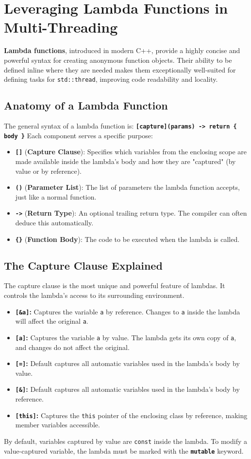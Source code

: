 \documentclass{article} %
\begin{document}
\section{Leveraging Lambda Functions in Multi-Threading}
\textbf{Lambda functions}, introduced in modern C++, provide a highly concise and powerful syntax for creating anonymous function objects. Their ability to be defined inline where they are needed makes them exceptionally well-suited for defining tasks for \texttt{std::thread}, improving code readability and locality.

\subsection{Anatomy of a Lambda Function}
The general syntax of a lambda function is:
\texttt{\textbf{[capture](params) -> return \{ body \}}}
Each component serves a specific purpose:
\begin{itemize}
    \item \textbf{\texttt{[]}} (\textbf{Capture Clause}): Specifies which variables from the enclosing scope are made available inside the lambda's body and how they are "captured" (by value or by reference).
    \item \textbf{\texttt{()}} (\textbf{Parameter List}): The list of parameters the lambda function accepts, just like a normal function.
    \item \textbf{\texttt{->}} (\textbf{Return Type}): An optional trailing return type. The compiler can often deduce this automatically.
    \item \textbf{\texttt{\{\}}} (\textbf{Function Body}): The code to be executed when the lambda is called.
\end{itemize}

\subsection{The Capture Clause Explained}
The capture clause is the most unique and powerful feature of lambdas. It controls the lambda's access to its surrounding environment.
\begin{itemize}
    \item \textbf{\texttt{[\&a]}:} Captures the variable \texttt{a} by reference. Changes to \texttt{a} inside the lambda will affect the original \texttt{a}.
    \item \textbf{\texttt{[a]}:} Captures the variable \texttt{a} by value. The lambda gets its own copy of \texttt{a}, and changes do not affect the original.
    \item \textbf{\texttt{[=]}:} Default captures all automatic variables used in the lambda's body by value.
    \item \textbf{\texttt{[\&]}:} Default captures all automatic variables used in the lambda's body by reference.
    \item \textbf{\texttt{[this]}:} Captures the \texttt{this} pointer of the enclosing class by reference, making member variables accessible.
\end{itemize}
By default, variables captured by value are \texttt{const} inside the lambda. To modify a value-captured variable, the lambda must be marked with the \textbf{\texttt{mutable}} keyword.
\end{document}
